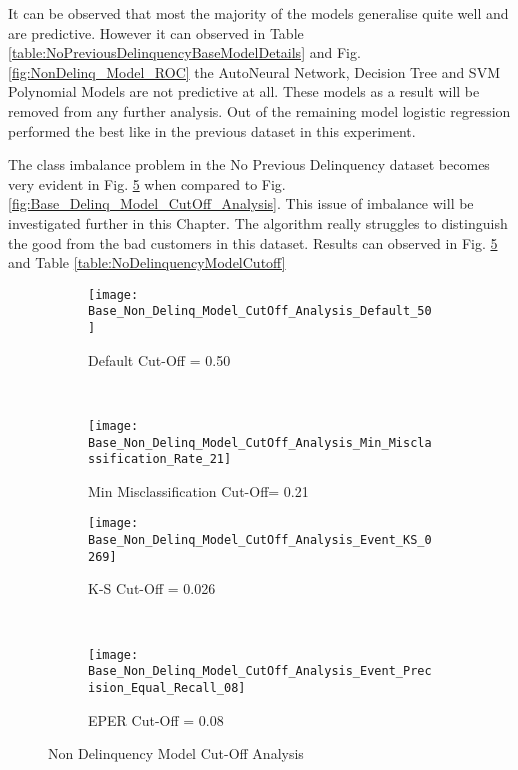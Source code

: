 It can be observed that most the majority of the models generalise quite well and are predictive. However it can observed in Table \ref{table:NoPreviousDelinquencyBaseModelDetails} and Fig. \ref{fig:NonDelinq_Model_ROC} the AutoNeural Network, Decision Tree and SVM Polynomial Models are not predictive at all. These models as a result will be removed from any further analysis. Out of the remaining model logistic regression performed the best like in the previous dataset in this experiment. 



The class imbalance problem in the No Previous Delinquency dataset becomes very evident in Fig.  \ref{fig:NonDelinquencyModelCutOffAnalysis} when compared to Fig. \ref{fig:Base_Delinq_Model_CutOff_Analysis}. This issue of imbalance will be investigated further in this Chapter. The algorithm really struggles to distinguish the good from the bad customers in this dataset. Results can observed in Fig. \ref{fig:NonDelinquencyModelCutOffAnalysis} and Table \ref{table:NoDelinquencyModelCutoff}

\begin{figure}[H]
	\centering
	\begin{adjustwidth}{-2cm}{-2cm}
	\begin{subfigure}[b]{ 0.60\textwidth}
		\captionsetup{font=scriptsize}
		\texttt{[image: Base\_Non\_Delinq\_Model\_CutOff\_Analysis\_Default\_50]}\caption{Default Cut-Off = 0.50}\label{fig:Base_Non_Delinq_Model_CutOff_Analysis_Default_50}
	\end{subfigure}  ~\quad
	\begin{subfigure}[b]{0.60\textwidth}
		\captionsetup{font=scriptsize}
		\texttt{[image: Base\_Non\_Delinq\_Model\_CutOff\_Analysis\_Min\_Misclassification\_Rate\_21]}
		\caption{Min Misclassification Cut-Off= 0.21}\label{fig:Base_Non_Delinq_Model_CutOff_Analysis_Min_Misclassification_Rate_17}
	\end{subfigure} 
	\medskip \newline
	\begin{subfigure}[b]{0.60\textwidth}
		\captionsetup{font=scriptsize}
		\texttt{[image: Base\_Non\_Delinq\_Model\_CutOff\_Analysis\_Event\_KS\_0269]}
		\caption{K-S Cut-Off = 0.026}\label{fig:Base_Non_Delinq_Model_CutOff_Analysis_Event_KS_026}
	\end{subfigure} ~\quad
	\begin{subfigure}[b]{0.60\textwidth}
		\captionsetup{font=scriptsize}
		\texttt{[image: Base\_Non\_Delinq\_Model\_CutOff\_Analysis\_Event\_Precision\_Equal\_Recall\_08]}
		\caption{EPER Cut-Off = 0.08}\label{fig:Base_Non_Delinq_Model_CutOff_Analysis_Event_Precision_Equal_Recall_09}
	\end{subfigure}
	\caption{Non Delinquency Model Cut-Off Analysis}
	\label{fig:NonDelinquencyModelCutOffAnalysis}
\end{adjustwidth}
\end{figure}

